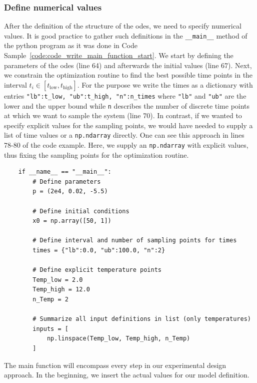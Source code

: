 \documentclass[graybox]{svmult}
\begin{document}
\subsubsection{Define numerical values}
After the definition of the structure of the \acp{ode}, we need to specify numerical values.
It is good practice to gather such definitions in the \texttt{__main__} method of the python program as it was done in Code Sample~\ref{code:code_write_main_function_start}.
We start by defining the parameters of the \acp{ode} (line 64) and afterwards the initial values (line 67).
Next, we constrain the optimization routine to find the best possible time points in the interval $t_i\in\left[t_\text{low},t_\text{high}\right]$.
For the purpose we write the times as a dictionary with entries \texttt{{"lb":t_low, "ub":t_high, "n":n_times}} where \texttt{"lb"} and \texttt{"ub"} are the lower and the upper bound while \texttt{n} describes the number of discrete time points at which we want to sample the system (line 70).
In contrast, if we wanted to specify explicit values for the sampling points, we would have needed to supply a list of time values or a \texttt{np.ndarray} directly.
One can see this approach in lines 78-80 of the code example.
Here, we supply an \texttt{np.ndarray} with explicit values, thus fixing the sampling points for the optimization routine.
\begin{code}[h]
    \begin{verbatim}
    if __name__ == "__main__":
        # Define parameters
        p = (2e4, 0.02, -5.5)

        # Define initial conditions
        x0 = np.array([50, 1])

        # Define interval and number of sampling points for times
        times = {"lb":0.0, "ub":100.0, "n":2}

        # Define explicit temperature points
        Temp_low = 2.0
        Temp_high = 12.0
        n_Temp = 2

        # Summarize all input definitions in list (only temperatures)
        inputs = [
            np.linspace(Temp_low, Temp_high, n_Temp)
        ]
    \end{verbatim}
    \caption{
        The main function will encompass every step in our experimental design approach.
        In the beginning, we insert the actual values for our model definition.
    }
    \label{code:code_write_main_function_start}
\end{code}
\end{document}
